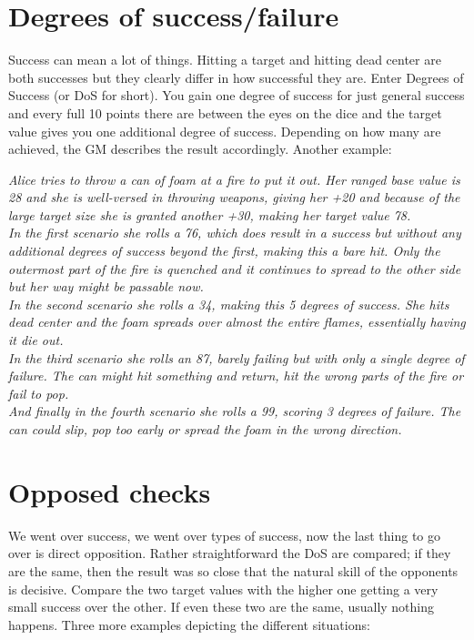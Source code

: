 \documentclass[12pt,a4paper]{book}
\newenvironment{exampleblock}[1][1]
{\hfill\begin{minipage}{\dimexpr\textwidth-#1cm}}
{\end{minipage}}
\begin{document}
	\section{Degrees of success/failure}
	Success can mean a lot of things. Hitting a target and hitting dead center are both successes but they clearly differ in how successful they are. Enter Degrees of Success (or DoS for short). You gain one degree of success for just general success and every full 10 points there are between the eyes on the dice and the target value gives you one additional degree of success. Depending on how many are achieved, the GM describes the result accordingly.
	Another example:
	
	\begin{exampleblock}\textit{
	Alice tries to throw a can of foam at a fire to put it out. Her ranged base value is 28 and she is well-versed in throwing weapons, giving her +20 and because of the large target size she is granted another +30, making her target value 78.\\
	In the first scenario she rolls a 76, which does result in a success but without any additional degrees of success beyond the first, making this a bare hit. Only the outermost part of the fire is quenched and it continues to spread to the other side but her way might be passable now.\\
	In the second scenario she rolls a 34, making this 5 degrees of success. She hits dead center and the foam spreads over almost the entire flames, essentially having it die out.\\
	In the third scenario she rolls an 87, barely failing but with only a single degree of failure. The can might hit something and return, hit the wrong parts of the fire or fail to pop.\\
	And finally in the fourth scenario she rolls a 99, scoring 3 degrees of failure. The can could slip, pop too early or spread the foam in the wrong direction.
		}
	\end{exampleblock}
	\section{Opposed checks}
	We went over success, we went over types of success, now the last thing to go over is direct opposition. Rather straightforward the DoS are compared; if they are the same, then the result was so close that the natural skill of the opponents is decisive. Compare the two target values with the higher one getting a very small success over the other. If even these two are the same, usually nothing happens. Three more examples depicting the different situations:
	
\end{document}
